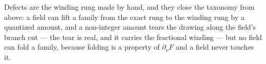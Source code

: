 Defects are the winding rung made by hand, and they close the taxonomy from
above: a field can lift a family from the exact rung to the winding rung by a
quantized amount, and a non-integer amount tears the drawing along the
field's branch cut --- the tear is real, and it carries the fractional
winding --- but no field can fold a family, because folding is a property of
$\partial_\nu F$ and a field never touches it.
